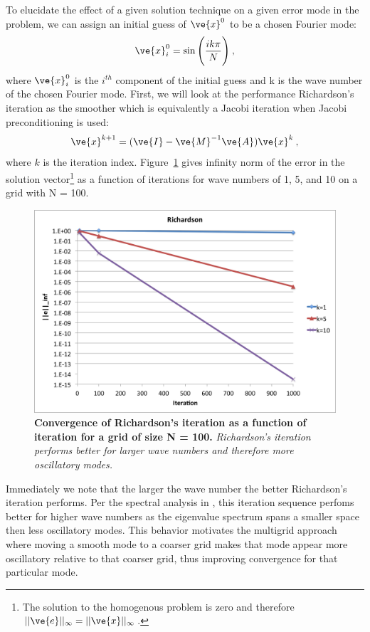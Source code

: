 \documentclass[note]{TechNote}
\begin{document}
To elucidate the effect of a given solution technique on a given error
mode in the problem, we can assign an initial guess of $\ve{x}^0$ to
be a chosen Fourier mode:
\begin{equation}
  \ve{x}^0_i = \sin\Bigg( \frac{ik\pi}{N} \Bigg)\:,
  \label{eq:fourier_mode}
\end{equation}
where $\ve{x}^0_i$ is the $i^{th}$ component of the initial guess and
k is the wave number of the chosen Fourier mode. First, we will look at
the performance Richardson's iteration as the smoother which is
equivalently a Jacobi iteration when Jacobi preconditioning is used:
\begin{equation}
  \ve{x}^{k+1} = (\ve{I}-\ve{M}^{-1}\ve{A})\ve{x}^k\:,
\end{equation}
where $k$ is the iteration index. Figure~\ref{fig:richardson} gives
infinity norm of the error in the solution vector\footnote{The
  solution to the homogenous problem is zero and therefore
  $||\ve{e}||_{\infty} = ||\ve{x}||_{\infty}$.} as a function of
iterations for wave numbers of 1, 5, and 10 on a grid with N = 100.
\begin{figure}[h!]
  \begin{center}
    \includegraphics[width=5in]{richardson.png}
  \end{center}
  \caption{\textbf{Convergence of Richardson's iteration as a function
      of iteration for a grid of size N = 100.} \textit{Richardson's
      iteration performs better for larger wave numbers and therefore
      more oscillatory modes.}}
  \label{fig:richardson}
\end{figure}
Immediately we note that the larger the wave number the better
Richardson's iteration performs. Per the spectral analysis in
\cite{briggs_multigrid}, this iteration sequence perfoms better for
higher wave numbers as the eigenvalue spectrum spans a smaller space
then less oscillatory modes. This behavior motivates the multigrid
approach where moving a smooth mode to a coarser grid makes that mode
appear more oscillatory relative to that coarser grid, thus improving
convergence for that particular mode.
\end{document}
